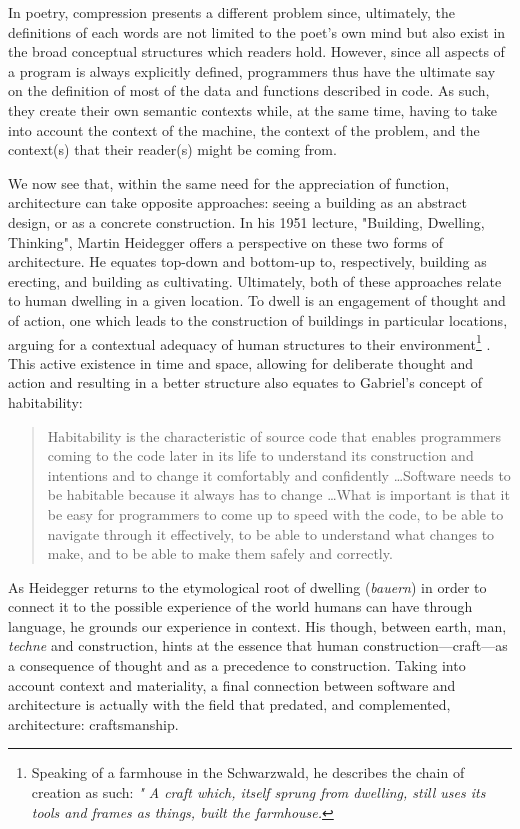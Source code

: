 In poetry, compression presents a different problem since, ultimately, the definitions of each words are not limited to the poet's own mind but also exist in the broad conceptual structures which readers hold. However, since all aspects of a program is always explicitly defined, programmers thus have the ultimate say on the definition of most of the data and functions described in code. As such, they create their own semantic contexts while, at the same time, having to take into account the context of the machine, the context of the problem, and the context(s) that their reader(s) might be coming from.

We now see that, within the same need for the appreciation of function, architecture can take opposite approaches: seeing a building as an abstract design, or as a concrete construction. In his 1951 lecture, "Building, Dwelling, Thinking", Martin Heidegger offers a perspective on these two forms of architecture. He equates top-down and bottom-up to, respectively, building as erecting, and building as cultivating. Ultimately, both of these approaches relate to human dwelling in a given location. To dwell is an engagement of thought and of action, one which leads to the construction of buildings in particular locations, arguing for a contextual adequacy of human structures to their environment\footnote{Speaking of a farmhouse in the Schwarzwald, he describes the chain of creation as such: \emph{" A craft which, itself sprung from dwelling, still uses its tools and frames as things, built the farmhouse.}} \citep{heidegger_building_1975}. This active existence in time and space, allowing for deliberate thought and action and resulting in a better structure also equates to Gabriel's concept of habitability:

\begin{quote}
    Habitability is the characteristic of source code that enables programmers coming to the code later in its life to understand its construction and intentions and to change it comfortably and confidently \dots Software needs to be habitable because it always has to change \dots What is important is that it be easy for programmers to come up to speed with the code, to be able to navigate through it effectively, to be able to understand what changes to make, and to be able to make them safely and correctly. \citep{gabriel_patterns_1998}
\end{quote}

As Heidegger returns to the etymological root of dwelling (\emph{bauern}) in order to connect it to the possible experience of the world humans can have through language, he grounds our experience in context. His though, between earth, man, \emph{techne} and construction, hints at the essence that human construction—craft—as a consequence of thought and as a precedence to construction. Taking into account context and materiality, a final connection between software and architecture is actually with the field that predated, and complemented, architecture: craftsmanship.

